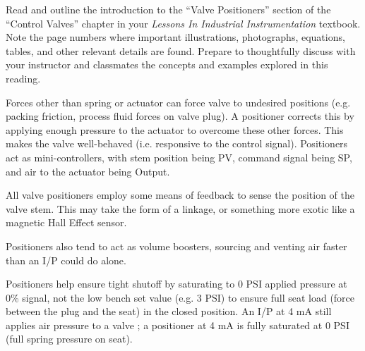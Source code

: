 

Read and outline the introduction to the ``Valve Positioners'' section of the ``Control Valves'' chapter in your {\it Lessons In Industrial Instrumentation} textbook.  Note the page numbers where important illustrations, photographs, equations, tables, and other relevant details are found.  Prepare to thoughtfully discuss with your instructor and classmates the concepts and examples explored in this reading.














Forces other than spring or actuator can force valve to undesired positions (e.g. packing friction, process fluid forces on valve plug).  A positioner corrects this by applying enough pressure to the actuator to overcome these other forces.  This makes the valve well-behaved (i.e. responsive to the control signal).  Positioners act as mini-controllers, with stem position being PV, command signal being SP, and air to the actuator being Output.

\vskip 10pt

All valve positioners employ some means of feedback to sense the position of the valve stem.  This may take the form of a linkage, or something more exotic like a magnetic Hall Effect sensor.

\vskip 10pt

Positioners also tend to act as volume boosters, sourcing and venting air faster than an I/P could do alone.

\vskip 10pt

Positioners help ensure tight shutoff by saturating to 0 PSI applied pressure at 0\% signal, not the low bench set value (e.g. 3 PSI) to ensure full seat load (force between the plug and the seat) in the closed position.  An I/P at 4 mA still applies air pressure to a valve ; a positioner at 4 mA is fully saturated at 0 PSI (full spring pressure on seat).

\vskip 10pt

